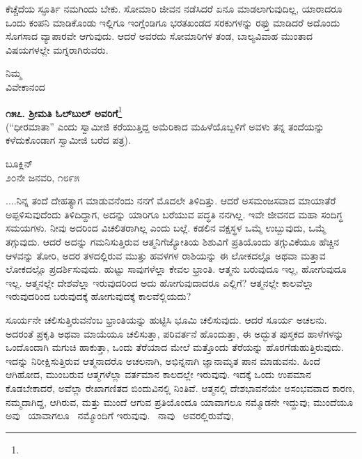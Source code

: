 ಕೆಚ್ಚೆದೆಯ ಸ್ಫೂರ್ತಿ ನಮಗಿಂದು ಬೇಕು. ಸೋಮಾರಿ ಜೀವನ ನಡೆಸಿದರೆ ಏನೂ ಮಾಡಲಾಗುವುದಿಲ್ಲ, ಯಾರಾದರೂ ಒಂದು ಕಂಪನಿ ಮಾಡಿಕೊಂಡು ಇಲ್ಲಿಗೂ ಇಂಗ್ಲೆಂಡಿಗೂ ಭರತಖಂಡದ ಸರಕುಗಳನ್ನು ರಫ್ತು ಮಾಡಿದರೆ ಅದೊಂದು ಸೊಗಸಾದ ವ್ಯಾಪಾರವೇ ಆಗುವುದು. ಆದರೆ ಅವರದು ಸೋಮಾರಿಗಳ ತಂಡ, ಬಾಲ್ಯವಿವಾಹ ಮುಂತಾದ ವಿಷಯಗಳಲ್ಲೇ ಮಗ್ನರಾಗಿರುವರು.

{\flushright
ನಿಮ್ಮ\\ವಿವೇಕಾನಂದ\par}

\begin{center}
\textbf{೧೫೭. ಶ‍್ರೀಮತಿ ಓಲ್‌ಬುಲ್ ಅವರಿಗೆ}\footnote{}\\ (“ಧೀರಮಾತಾ” ಎಂದು ಸ್ವಾಮೀಜಿ ಕರೆಯುತ್ತಿದ್ದ ಅಮೆರಿಕಾದ ಮಹಿಳೆಯೊಬ್ಬಳಿಗೆ ಅವಳು ತನ್ನ ತಂದೆಯನ್ನು ಕಳೆದುಕೊಂಡಾಗ ಸ್ವಾಮೀಜಿ ಬರೆದ ಪತ್ರ).
\end{center}

\begin{flushright}
ಬೂಕ್ಲಿನ್\\೨೦ನೇ ಜನವರಿ, ೧೮೯೫
\end{flushright}

....ನಿನ್ನ ತಂದೆ ದೇಹತ್ಯಾಗ ಮಾಡುವನೆಂದು ನನಗೆ ಮೊದಲೇ ತಿಳಿದಿತ್ತು. ಆದರೆ ಅಸಮಂಜಸವಾದ ಮಾಯಾತೆರೆ ಅಪ್ಪಳಿಸುವುದೆಂದು ತಿಳಿದಿದ್ದಾಗ, ಅದನ್ನು ಯಾರಿಗೂ ಬರೆಯುವ ಪದ್ಧತಿ ನನಗಿಲ್ಲ. ಇವೇ ಜೀವನದ ಮಹಾ ಸಂದಿಗ್ಧ ಸಮಯಗಳು. ನೀವು ಅದರಿಂದ ವಿಚಲಿತರಾಗಿಲ್ಲ ಎಂದು ಬಲ್ಲೆ. ಕಡಲಿನ ವಕ್ಷಸ್ಥಳ ಒಮ್ಮೆ ಉಬ್ಬುವುದು, ಒಮ್ಮೆ ತಗ್ಗುವುದು. ಆದರೆ ಅದನ್ನು ಗಮನಿಸುತ್ತಿರುವ ಆತ್ಮನಿಗೆ\enginline{-}ಜ್ಯೋತಿಯ ಶಿಶುವಿಗೆ\enginline{-} ಪ್ರತಿಯೊಂದು ತಗ್ಗುವಿಕೆಯೂ ಹೆಚ್ಚಿನ ಆಳವನ್ನು ತೋರಿ, ಅದರ ತಳದಲ್ಲಿರುವ ಮುತ್ತು ಹವಳಗಳ ರಾಶಿಯನ್ನು ಈ ಲೋಕದಲ್ಲೊ ಅಥವಾ ಮತ್ತಾವ ಲೋಕದಲ್ಲೊ ಪ್ರದರ್ಶಿಸುವುದು. ಹುಟ್ಟು ಸಾವುಗಳೆಲ್ಲಾ ಕೇವಲ ಭ್ರಾಂತಿ. ಆತ್ಮನು ಬರುವುದೂ ಇಲ್ಲ, ಹೋಗುವುದೂ ಇಲ್ಲ. ಆತ್ಮನಲ್ಲೇ ದೇಶವೆಲ್ಲಾ ಇರುವುದರಿಂದ ಅದು ಹೋಗುವುದಾದರೂ ಎಲ್ಲಿಗೆ? ಆತ್ಮನಲ್ಲೇ ಕಾಲವೆಲ್ಲಾ ಇರುವುದರಿಂದ ಬರುವುದಕ್ಕೆ ಹೋಗುವುದಕ್ಕೆ ಕಾಲವೆಲ್ಲಿಯದು?

ಸೂರ್ಯನೇ ಚಲಿಸುತ್ತಿರುವನೆಂಬ ಭ್ರಾಂತಿಯನ್ನು ಹುಟ್ಟಿಸಿ ಭೂಮಿ ಚಲಿಸುವುದು. ಆದರೆ ಸೂರ್ಯ ಅಚಲನು. ಅದರಂತೆ ಪ್ರಕೃತಿ ಅಥವಾ ಮಾಯೆಯೂ ಚಲಿಸುತ್ತಾ, ಪರಿವರ್ತನೆ ಹೊಂದುತ್ತಾ, ಈ ಅದ್ಭುತ ಪುಸ್ತಕದ ಹಾಳೆಗಳನ್ನು ಒಂದೊಂದಾಗಿ ಮಗುಚಿ ಹಾಕುತ್ತಾ, ಒಂದು ತೆರೆಯಾದ ಮೇಲೆ ಮತ್ತೊಂದು ತೆರೆಯನ್ನು ಹೊರಗೆಡುಹುತ್ತಿರುವುದು. ಇದನ್ನು ನಿರೀಕ್ಷಿಸುತ್ತಿರುವ ಆತ್ಮನಾದರೊ ಅಚಲನಾಗಿ, ಅಭಿನ್ನನಾಗಿ ಜ್ಞಾನಾಮೃತ ಪಾನ ಮಾಡುವನು. ಹಿಂದೆ ಆಗಿಹೋದ, ಮುಂಬರುವ ಆತ್ಮಗಳೆಲ್ಲಾ ವರ್ತಮಾನ ಕಾಲದಲ್ಲೇ ಇರುವುವು. ಇದಕ್ಕೆ ಒಂದು ಉಪಮಾನ ಕೊಡಬೇಕಾದರೆ, ಅವೆಲ್ಲಾ ರೇಖಾಗಣಿತದ ಬಿಂದುವಿನಲ್ಲಿ ನಿಂತಿವೆ. ಆತ್ಮನಲ್ಲಿ ದೇಶಭಾವನೆಯೇ ಅಸಂಭವವಾದ ಕಾರಣ, ನಮ್ಮದಾಗಿದ್ದ, ಆಗಿರುವ, ಮತ್ತು ಮುಂದೆ ಆಗುವ ಪ್ರತಿಯೊಂದೂ ಯಾವಾಗಲೂ ನಮ್ಮೊಡನೇ ಇದ್ದುವು; ಮುಂದೆಯೂ ಅವು~ ಯಾವಾಗಲೂ~ ನಮ್ಮೊಂದಿಗೆ ಇರುವುವು.~ ನಾವು ~ಅವರಲ್ಲಿರುವೆವು,



